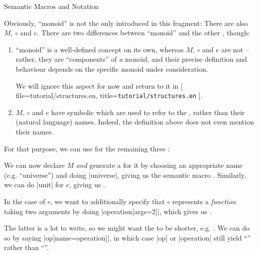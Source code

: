 \documentclass[lang={en,de}]{stex}
\begin{document}
    \begin{sfragment}{Semantic Macros and Notation}


    Obviously, ``monoid'' is not the only  introduced in this
    fragment: There are also $M$, $\circ$ and $e$.
    There are two differences between ``monoid'' and the other ,
    though:
    \begin{enumerate}
        \item ``monoid'' is a well-defined concept on its own,
        whereas $M$, $\circ$ and $e$ are not -- rather, they are 
        ``components'' of \emph{a} monoid, and their precise definition
        and behaviour depends on the specific monoid under consideration.

        We will ignore this aspect for now and return to it in 
        [
            file=tutorial/structures.en,
            title=\texttt{tutorial/structures.en}
        ].
        \item $M$, $\circ$ and $e$ have symbolic 
        which are used to refer to the , rather than their
        (natural language) names. Indeed, the definition above does
        not even mention their names.
    \end{enumerate}

    For that purpose, we can use  for the remaining
    three :



    We can now declare $M$ \emph{and} generate a  
    for it by choosing an
    appropriate name (e.g. ``universe'') and doing
    |{universe}|, giving us the semantic macro
    . Similarly, we can do
    |{unit}| for $e$, giving us . 
    
    In the case of $\circ$,
    we want to additionally specify that $\circ$ represents
    a \emph{function} taking two arguments by doing
    |{operation}[args=2]|, which gives us
    .

    

    The latter is a lot to write, so we might want the
     to be shorter, e.g. .
    We can do so by saying |{op}[name=operation]|,
    in which case |{op}| or |{operation}|
    still yield ``'' rather than ``''.


\end{sfragment}
\end{document}
